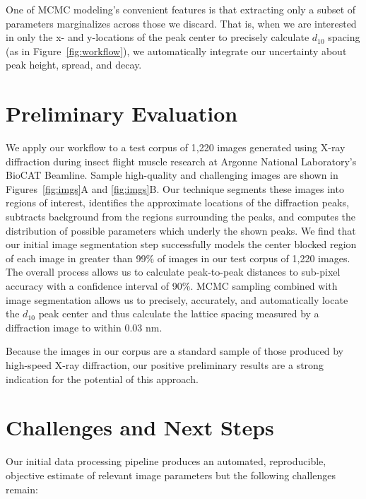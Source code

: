 \documentclass{sig-alternate}
\begin{document}
One of MCMC modeling's convenient features is that extracting only a
subset of parameters marginalizes across those we discard. That is,
when we are interested in only the x- and y-locations of the peak
center to precisely calculate $d_{10}$ spacing (as in
Figure~\ref{fig:workflow}), we automatically integrate our uncertainty
about peak height, spread, and decay.


\section{Preliminary Evaluation}
\label{sec:eval}

We apply our workflow to a test corpus of 1,220 images generated using
X-ray diffraction during insect flight muscle research at Argonne
National Laboratory's BioCAT Beamline. Sample high-quality and
challenging images are shown in Figures~\ref{fig:imgs}A and
\ref{fig:imgs}B. Our technique segments these images into regions of
interest, identifies the approximate locations of the diffraction
peaks, subtracts background from the regions surrounding the peaks,
and computes the distribution of possible parameters which underly the
shown peaks.  We find that our initial image segmentation step
successfully models the center blocked region of each image in greater
than 99\% of images in our test corpus of 1,220 images. The overall
process allows us to calculate peak-to-peak distances to sub-pixel
accuracy with a confidence interval of 90\%. MCMC sampling combined
with image segmentation allows us to precisely, accurately, and
automatically locate the $d_{10}$ peak center and thus calculate the
lattice spacing measured by a diffraction image to within 0.03 nm.

Because the images in our corpus are a standard sample of those
produced by high-speed X-ray diffraction, our positive preliminary
results are a strong indication for the potential of this approach.


\section{Challenges and Next Steps}
\label{sec:challenges}

Our initial data processing pipeline produces an automated,
reproducible, objective estimate of relevant image parameters but the
following challenges remain:
\end{document}
